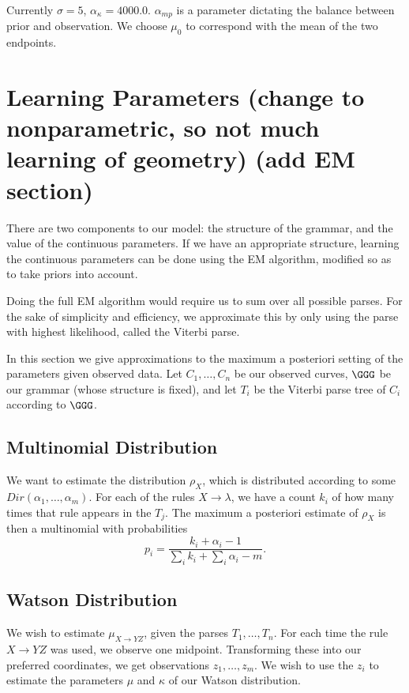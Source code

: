 Currently $\sigma=5$, $\alpha_\kappa = 4000.0$. $\alpha_{mp}$ is a
parameter dictating the balance between prior and observation.  We
choose $\mu_0$ to correspond with the mean of the two endpoints.


\section{Learning Parameters (change to nonparametric, so not much learning of geometry) (add EM section)}

There are two components to our model: the structure of the grammar,
and the value of the continuous parameters. If we have an appropriate
structure, learning the continuous parameters can be done using the EM
algorithm, modified so as to take priors into account.

Doing the full EM algorithm would require us to sum over all possible
parses. For the sake of simplicity and efficiency, we approximate this
by only using the parse with highest likelihood, called the Viterbi
parse.

In this section we give approximations to the maximum a posteriori
setting of the parameters given observed data. Let $C_1, \dots, C_n$
be our observed curves, $\GGG$ be our grammar (whose structure is
fixed), and let $T_i$ be the Viterbi parse tree of $C_i$ according to
$\GGG$.

\subsection{Multinomial Distribution}

We want to estimate the distribution $\rho_X$, which is distributed
according to some $Dir(\alpha_1, \dots, \alpha_m)$. For each of the
rules $X\to \lambda$, we have a count $k_i$ of how many times that
rule appears in the $T_j$. The maximum a posteriori estimate of
$\rho_X$ is then a multinomial with probabilities 
$$p_i = \frac{k_i + \alpha_i - 1}{\sum_i k_i + \sum_i \alpha_i - m}.$$

\subsection{Watson Distribution}

We wish to estimate $\mu_{X\to YZ}$, given the parses $T_1, \dots,
T_n$. For each time the rule $X\to YZ$ was used, we observe one
midpoint. Transforming these into our preferred coordinates, we get
observations $z_1, \dots, z_m$. We wish to use the $z_i$ to estimate
the parameters $\mu$ and $\kappa$ of our Watson distribution.

